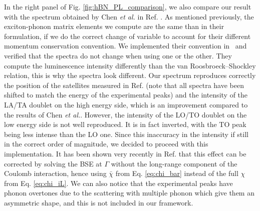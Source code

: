 In the right panel of Fig. \ref{fig:hBN_PL_comparison}, we also compare our result with the spectrum obtained by Chen \textit{et al.} in Ref. \cite{chen2020exciton}. As mentioned previously, the exciton-phonon matrix elements we compute are the same than in their formulation, if we do the correct change of variable to account for their different momentum conservation convention. We implemented their convention in \yambo~and verified that the spectra do not change when using one or the other. They compute the luminescence intensity differently than the van Roosbroeck--Shockley relation, this is why the spectra look different. Our spectrum reproduces correctly the position of the satellites measured in Ref. \cite{schue2019bright} (note that all spectra have been shifted to match the energy of the experimental peaks) and the intensity of the LA/TA doublet on the high energy side, which is an improvement compared to the results of Chen \textit{et al.}. However, the intensity of the LO/TO doublet on the low energy side is not well reproduced. It is in fact inverted, with the TO peak being less intense than the LO one. Since this inaccuracy in the intensity if still in the correct order of magnitude, we decided to proceed with this implementation. It has been shown very recently in Ref. \cite{zanfrognini2023distinguishing} that this effect can be corrected by solving the \acrshort{BSE} at $\Gamma$ without the long-range component of the Coulomb interaction, hence using $\bar{\chi}$ from Eq. \eqref{eq:chi_bar} instead of the full $\chi$ from Eq. \eqref{eq:chi_iL}. We can also notice that the experimental peaks have phonon overtones due to the scattering with multiple phonon which give them an asymmetric shape,\cite{vuong2017exciton} and this is not included in our framework.

